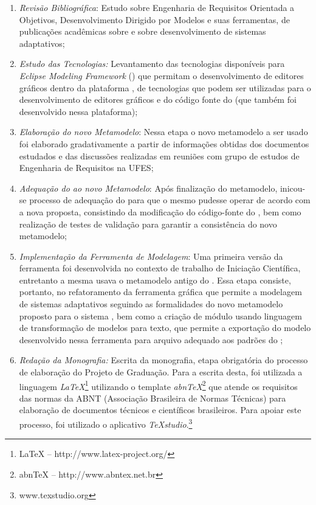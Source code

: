 \begin{enumerate}
	
	\item \textit{Revisão Bibliográfica}: Estudo sobre Engenharia de Requisitos Orientada a Objetivos, Desenvolvimento Dirigido por Modelos e suas ferramentas, de publicações acadêmicas sobre \zanshin e sobre desenvolvimento de sistemas adaptativos;
	
	\item \textit{Estudo das Tecnologias:} Levantamento das tecnologias disponíveis para \textit{Eclipse Modeling Framework} (\emf) que permitam o desenvolvimento de editores gráficos dentro da plataforma \eclipse, de tecnologias que podem ser utilizadas para o desenvolvimento de editores gráficos e do código fonte do \zanshin (que também foi desenvolvido nessa plataforma);
	
	\item \textit{Elaboração do novo Metamodelo}: Nessa etapa o novo metamodelo a ser usado foi elaborado gradativamente a partir de informações obtidas dos documentos estudados e das discussões realizadas em reuniões com grupo de estudos de Engenharia de Requisitos na UFES;
	
	\item \textit{Adequação do \zanshin ao novo Metamodelo}: Após finalização do metamodelo, inicou-se processo de adequação do \framework para que o mesmo pudesse operar de acordo com a nova proposta, consistindo da modificação do código-fonte do \zanshin, bem como realização de testes de validação para garantir a consistência do novo metamodelo;
	
	\item \textit{Implementação da Ferramenta de Modelagem}: Uma primeira versão da ferramenta foi desenvolvida no contexto de trabalho de Iniciação Científica, entretanto a mesma usava o metamodelo antigo do \zanshin. Essa etapa consiste, portanto, no refatoramento da ferramenta gráfica que permite a modelagem de sistemas adaptativos seguindo as formalidades do novo metamodelo proposto para o sistema \zanshin, bem como a criação de módulo usando linguagem de transformação de modelos para texto, que permite a exportação do modelo desenvolvido nessa ferramenta para arquivo \xml adequado aos padrões do \framework;
	
	\item \textit{Redação da Monografia:} Escrita da monografia, etapa obrigatória do processo de elaboração do Projeto de Graduação. Para a escrita desta, foi utilizada a linguagem \textit{LaTeX}\footnote{LaTeX -- http://www.latex-project.org/} utilizando o template \textit{abnTeX}\footnote{abnTeX -- http://www.abntex.net.br} que atende os requisitos das normas da ABNT (Associação Brasileira de Normas Técnicas) para elaboração de documentos técnicos e científicos brasileiros. Para apoiar este processo, foi utilizado o aplicativo \textit{TeXstudio}.\footnote{www.texstudio.org}
	
\end{enumerate}


